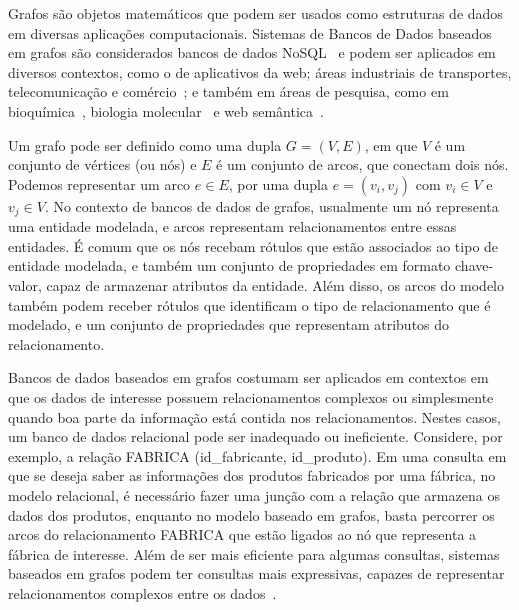 \documentclass[conference]{IEEEtran}
\begin{document}

Grafos são objetos matemáticos que podem ser usados como estruturas de
dados em diversas aplicações computacionais. Sistemas de Bancos de Dados
baseados em grafos são considerados bancos de dados
NoSQL~\cite{nosqlorg} e podem ser aplicados em diversos contextos, como
o de aplicativos da web; áreas industriais de transportes,
telecomunicação e comércio~\cite{neo4jcustomers}; e também em áreas de
pesquisa, como em bioquímica~\cite{biochem4j}, biologia
molecular~\cite{biomol} e web semântica~\cite{sematicweb}.

Um grafo pode ser definido como uma dupla $G = (V, E)$,
em que $V$ é um conjunto de vértices (ou nós) e $E$ é um conjunto de
arcos, que conectam dois nós. Podemos representar um arco $e \in E$,
por uma dupla $e = (v_i, v_j)$ com $v_i \in V$ e $v_j \in V$. No
contexto de bancos de dados de grafos, usualmente um nó representa
uma entidade modelada, e arcos representam relacionamentos entre essas
entidades. É comum que os nós recebam rótulos que estão associados ao
tipo de entidade modelada, e também um conjunto de propriedades em
formato chave-valor, capaz de armazenar atributos da entidade. Além
disso, os arcos do modelo também podem receber rótulos que identificam
o tipo de relacionamento que é modelado, e um conjunto de propriedades
que representam atributos do relacionamento.

Bancos de dados baseados em grafos costumam ser aplicados em contextos
em que os dados de interesse possuem relacionamentos complexos ou
simplesmente quando boa parte da informação está contida nos
relacionamentos. Nestes casos, um banco de dados relacional pode ser
inadequado ou ineficiente. Considere, por exemplo, a relação
{\ttfamily FABRICA (id\_fabricante, id\_produto)}. Em uma consulta em
que se deseja saber as informações dos produtos fabricados por uma
fábrica, no modelo relacional, é necessário fazer uma junção com a
relação que armazena os dados dos produtos, enquanto no modelo baseado
em grafos, basta percorrer os arcos do relacionamento
{\ttfamily FABRICA} que estão ligados ao nó que representa a fábrica de
interesse. Além de ser mais eficiente para algumas consultas, sistemas
baseados em grafos podem ter consultas mais expressivas, capazes de
representar relacionamentos complexos entre os dados~\cite{neo4jquery}.
\end{document}
